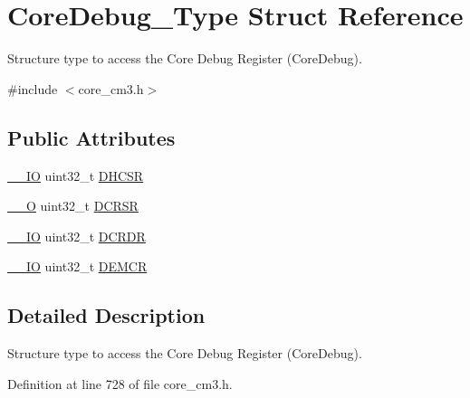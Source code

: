 \hypertarget{struct_core_debug___type}{\section{\-Core\-Debug\-\_\-\-Type \-Struct \-Reference}
\label{struct_core_debug___type}
}


\-Structure type to access the \-Core \-Debug \-Register (\-Core\-Debug).  




{\ttfamily \#include $<$core\-\_\-cm3.\-h$>$}

\subsection*{\-Public \-Attributes}
\begin{DoxyCompactItemize}
\item 
\hyperlink{group___c_m_s_i_s__core__definitions_gaec43007d9998a0a0e01faede4133d6be}{\-\_\-\-\_\-\-I\-O} uint32\-\_\-t \hyperlink{struct_core_debug___type_a25c14c022c73a725a1736e903431095d}{\-D\-H\-C\-S\-R}
\item 
\hyperlink{group___c_m_s_i_s__core__definitions_ga7e25d9380f9ef903923964322e71f2f6}{\-\_\-\-\_\-\-O} uint32\-\_\-t \hyperlink{struct_core_debug___type_afefa84bce7497652353a1b76d405d983}{\-D\-C\-R\-S\-R}
\item 
\hyperlink{group___c_m_s_i_s__core__definitions_gaec43007d9998a0a0e01faede4133d6be}{\-\_\-\-\_\-\-I\-O} uint32\-\_\-t \hyperlink{struct_core_debug___type_ab8f4bb076402b61f7be6308075a789c9}{\-D\-C\-R\-D\-R}
\item 
\hyperlink{group___c_m_s_i_s__core__definitions_gaec43007d9998a0a0e01faede4133d6be}{\-\_\-\-\_\-\-I\-O} uint32\-\_\-t \hyperlink{struct_core_debug___type_a5cdd51dbe3ebb7041880714430edd52d}{\-D\-E\-M\-C\-R}
\end{DoxyCompactItemize}


\subsection{\-Detailed \-Description}
\-Structure type to access the \-Core \-Debug \-Register (\-Core\-Debug). 

\-Definition at line 728 of file core\-\_\-cm3.\-h.



